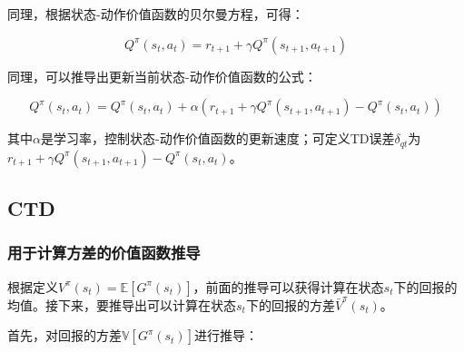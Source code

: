 \documentclass[UTF8]{ctexart}
\begin{document}
同理，根据状态-动作价值函数的贝尔曼方程，可得：

$$Q^{\pi}(s_t, a_t) = r_{t+1} + \gamma Q^{\pi}(s_{t+1}, a_{t+1})$$

同理，可以推导出更新当前状态-动作价值函数的公式：

$$
Q^{\pi}(s_t, a_t) = Q^{\pi}(s_t, a_t) + \alpha (r_{t+1} + \gamma Q^{\pi}(s_{t+1}, a_{t+1}) - Q^{\pi}(s_t, a_t))
$$

其中$\alpha$是学习率，控制状态-动作价值函数的更新速度；可定义TD误差$\delta_{qt}$为$r_{t+1} + \gamma Q^{\pi}(s_{t+1}, a_{t+1}) - Q^{\pi}(s_t, a_t)$。

\subsection{CTD}

\subsubsection{用于计算方差的价值函数推导}

根据定义$V^{\pi}(s_t) = \mathbb{E}[G^{\pi}(s_t)]$，前面的推导可以获得计算在状态$s_t$下的回报的均值。接下来，要推导出可以计算在状态$s_t$下的回报的方差$\bar{V}^{\pi}(s_t)$。

首先，对回报的方差$\mathbb{V}[G^{\pi}(s_t)]$进行推导：
\end{document}
